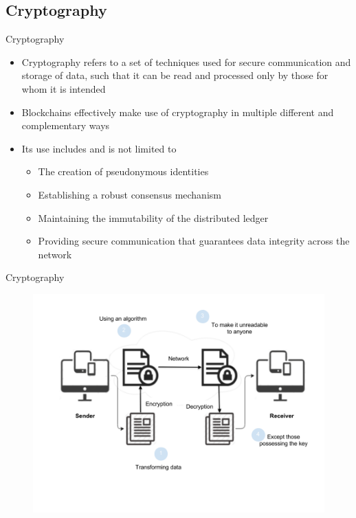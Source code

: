 \documentclass[9pt]{beamer}
\begin{document}
\subsection{Cryptography}

\begin{frame}{Cryptography}
	\begin{itemize}
		\item Cryptography refers to a set of techniques used for secure communication and storage of data, such that it can be read and processed only by those for whom it is intended
		\item Blockchains effectively make use of cryptography in multiple different and complementary ways
		\item Its use includes and is not limited to
		\begin{itemize}
			\item The creation of pseudonymous identities
			\item Establishing a robust consensus mechanism
			\item Maintaining the immutability of the distributed ledger
			\item Providing secure communication that guarantees data integrity across the network
		\end{itemize}
	\end{itemize}
\end{frame}



\begin{frame}{Cryptography}
	\begin{figure}[]
		\centering
		\includegraphics  [scale=0.3]{Images/cryptography}
		\begin{centering}
		\end{centering}
	\end{figure}
\end{frame}
\end{document}
